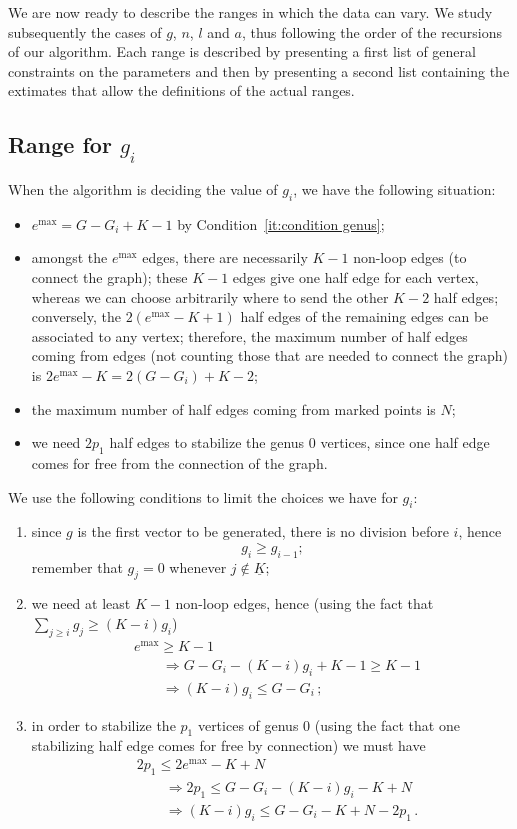 \documentclass{amsart}
\theoremstyle{plain}
\theoremstyle{definition}
\DeclareMathOperator{\MAX}{max}
\newcommand{\ubar}[1]{\underline{#1}}
\begin{document}
We are now ready to describe the ranges in which the data can vary.
We study subsequently the cases of $g$, $n$, $l$ and $a$, thus
following the order of the recursions of our algorithm. Each range is
described by presenting a first list of general constraints on the
parameters and then by presenting a second list containing the
extimates that allow the definitions of the actual ranges.


\subsection{Range for $g_i$}

When the algorithm is deciding the value of $g_i$, we have the
following situation:
\begin{itemize}
\item $e^{\MAX} = G - G_i + K - 1$ by Condition~\ref{it:condition genus};
\item amongst the $e^{\MAX}$ edges, there are necessarily $K-1$
  non-loop edges (to connect the graph); these $K-1$ edges give one
  half edge for each vertex, whereas we can choose arbitrarily where
  to send the other $K-2$ half edges; conversely, the $2(e^{\MAX} - K
  +1)$ half edges of the remaining edges can be associated to any
  vertex; therefore, the maximum number of half edges coming from
  edges (not counting those that are needed to connect the graph) is
  $2e^{\MAX} - K = 2(G - G_i) + K - 2$;
\item the maximum number of half edges coming from marked points is
  $N$;
\item we need $2p_1$ half edges to stabilize the genus $0$ vertices,
  since one half edge comes for free from the connection of the graph.
\end{itemize}

We use the following conditions to limit the choices we have for
$g_i$:
\begin{enumerate}
\item since $g$ is the first vector to be generated, there is no
  division before $i$, hence
  \[
  g_i \geq g_{i-1}\text{;}
  \]
  remember that $g_j = 0$ whenever $j \not\in \ubar{K}$;
\item we need at least $K-1$ non-loop edges, hence (using the fact
  that $\sum_{j \geq i} g_j \geq (K-i) g_i$)
  \begin{align*}
    &e^{\MAX} \geq K-1\\
    &\qquad\Rightarrow G - G_i - (K-i) g_i + K-1 \geq K-1\\
    &\qquad\Rightarrow (K-i)g_i \leq G - G_i\,\text{;}
  \end{align*}
\item in order to stabilize the $p_1$ vertices of genus $0$ (using the
  fact that one stabilizing half edge comes for free by connection) we
  must have
  \begin{align*}
    &2 p_1 \leq 2e^{\MAX} - K + N\\
    &\qquad\Rightarrow 2p_1 \leq G - G_i - (K-i)g_i - K + N\\
    &\qquad\Rightarrow (K-i)g_i \leq G - G_i - K + N - 2p_1\,\text{.}
  \end{align*}
\end{enumerate}
\end{document}
